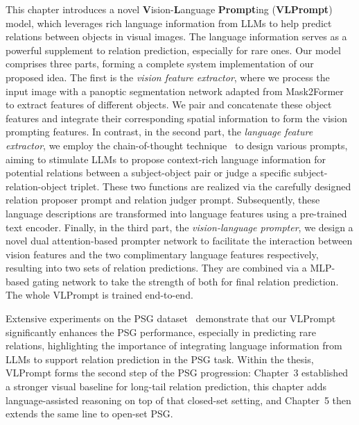 This chapter introduces a novel \textbf{V}ision-\textbf{L}anguage \textbf{Prompt}ing (\textbf{VLPrompt}) model, which leverages rich language information from LLMs to help predict relations between objects in visual images.
The language information serves as a powerful supplement to relation prediction, especially for rare ones.
Our model comprises three parts, forming a complete system implementation of our proposed idea.
The first is the \emph{vision feature extractor}, where we process the input image with a panoptic segmentation network adapted from Mask2Former~\citep{cheng2022masked} to extract features of different objects.
We pair and concatenate these object features and integrate their corresponding spatial information to form the vision prompting features.
In contrast, in the second part, the \emph{language feature extractor}, we employ the chain-of-thought technique~\citep{wei2022chain} to design various prompts, aiming to stimulate LLMs to propose context-rich language information for potential relations between a subject-object pair or judge a specific subject-relation-object triplet.
These two functions are realized via the carefully designed relation proposer prompt and relation judger prompt.  
Subsequently, these language descriptions are transformed into language features using a pre-trained text encoder.
Finally, in the third part, the \emph{vision-language prompter}, we design a novel dual attention-based prompter network to facilitate the interaction between vision features and the two complimentary language features respectively, resulting into two sets of relation predictions.
They are combined via a MLP-based gating network to take the strength of both for final relation prediction.
The whole VLPrompt is trained end-to-end.

Extensive experiments on the PSG dataset~\citep{yang2022panoptic} demonstrate that our VLPrompt significantly enhances the PSG performance, especially in predicting rare relations, highlighting the importance of integrating language information from LLMs to support relation prediction in the PSG task.
Within the thesis, VLPrompt forms the second step of the PSG progression: Chapter~3 established a stronger visual baseline for long-tail relation prediction, this chapter adds language-assisted reasoning on top of that closed-set setting, and Chapter~5 then extends the same line to open-set PSG.
